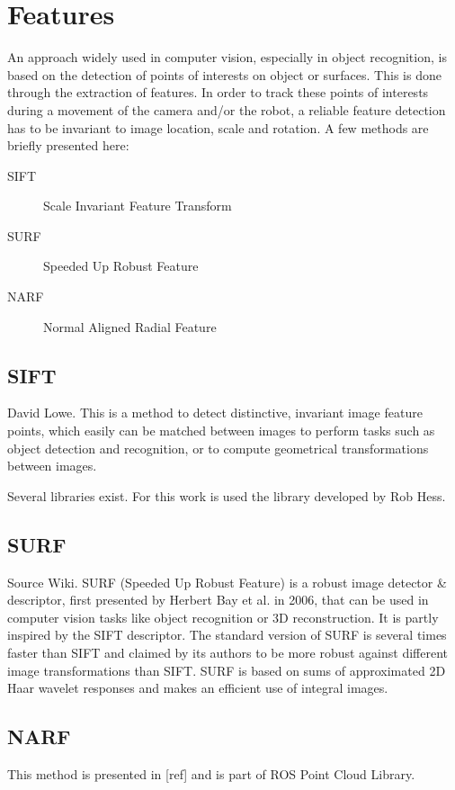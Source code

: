 \documentclass[a4paper,11pt]{kth-mag}
\begin{document}
\section{Features}

An approach widely used in computer vision, especially in object recognition, is based on the detection of points of interests on object or surfaces. This is done through the extraction of features. In order to track these points of interests during a movement of the camera and/or the robot, a reliable feature detection has to be invariant to image location, scale and rotation. A few methods are briefly presented here:
\begin{description}
\item[SIFT] Scale Invariant Feature Transform
\item[SURF] Speeded Up Robust Feature
\item[NARF] Normal Aligned Radial Feature
\end{description}

\subsection{SIFT}
David Lowe.
This is a method to detect distinctive, invariant image feature points, which easily can be matched between images to perform tasks such as object detection and recognition, or to compute geometrical transformations between images.

Several libraries exist. For this work is used the library developed by Rob Hess.

\subsection{SURF}
Source Wiki.
SURF (Speeded Up Robust Feature) is a robust image detector \& descriptor, first presented by Herbert Bay et al. in 2006, that can be used in computer vision tasks like object recognition or 3D reconstruction. It is partly inspired by the SIFT descriptor. The standard version of SURF is several times faster than SIFT and claimed by its authors to be more robust against different image transformations than SIFT. SURF is based on sums of approximated 2D Haar wavelet responses and makes an efficient use of integral images.

\subsection{NARF}
This method is presented in [ref] and is part of ROS Point Cloud Library.
\end{document}
